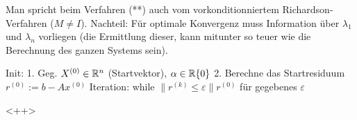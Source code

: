  \begin{bemerkung}
 Man spricht beim Verfahren (**) auch vom vorkonditionniertem Richardson-Verfahren ($M\neq I$). 
 Nachteil: Für optimale Konvergenz muss Information über $\lambda_1$ und $\lambda_n$ vorliegen (die Ermittlung dieser, kann mitunter so teuer wie die Berechnung des ganzen Systems sein).
 \end{bemerkung}

 \begin{algorithmus}
   Init: 1. Geg. $X^{(0)}\in \mathbb{R}^n$ (Startvektor), $\alpha\in\mathbb{R} \\ \{0\}$
   2. Berechne das Startresiduum $r^{(0)} := b-Ax^{(0)}$
   Iteration: while $\|r^{(k)} \leq \varepsilon \|r^{(0)}$ für gegebenes $\varepsilon$
   
 \end{algorithmus}<++>

